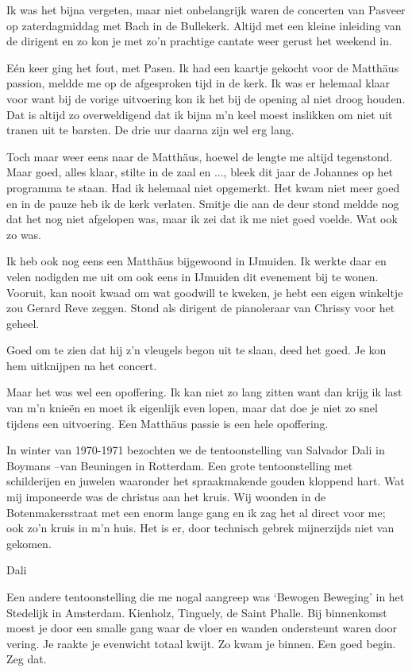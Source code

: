 \documentclass[10pt,twoside,openright]{memoir}
\begin{document}
Ik was het bijna vergeten, maar niet onbelangrijk waren de concerten van Pasveer op zaterdagmiddag met Bach in de Bullekerk. Altijd met een kleine inleiding van de dirigent en zo kon je met zo’n prachtige cantate weer gerust het weekend in.

Eén keer ging het fout, met Pasen. Ik had een kaartje gekocht voor de Matthäus passion, meldde me op de afgesproken tijd in de kerk. Ik was er helemaal klaar voor want bij de vorige uitvoering kon ik het bij de opening al niet droog houden. Dat is altijd zo overweldigend dat ik bijna m’n keel moest inslikken om niet uit tranen uit te barsten. De drie uur daarna zijn wel erg lang. 

Toch maar weer eens naar de Matthäus, hoewel de lengte me altijd tegenstond. Maar goed, alles klaar, stilte in de zaal en ..., bleek dit jaar de Johannes op het programma te staan. Had ik helemaal niet opgemerkt. Het kwam niet meer goed en in de pauze heb ik de kerk verlaten. Smitje die aan de deur stond meldde nog dat het nog niet afgelopen was, maar ik zei dat ik me niet goed voelde. Wat ook zo was.

Ik heb ook nog eens een Matthäus bijgewoond in IJmuiden. Ik werkte daar en velen nodigden me uit om ook eens in IJmuiden dit evenement bij te wonen. Vooruit, kan nooit kwaad om wat goodwill te kweken, je hebt een eigen winkeltje zou Gerard Reve zeggen. Stond als dirigent de pianoleraar van Chrissy voor het geheel. 

Goed om te zien dat hij z’n vleugels begon uit te slaan, deed het goed. Je kon hem uitknijpen na het concert.  

Maar het was wel een opoffering. Ik kan niet zo lang zitten want dan krijg ik last van m’n knieën en moet ik eigenlijk even lopen, maar dat doe je niet zo snel tijdens een uitvoering. Een Matthäus passie is een hele opoffering.

In winter van 1970-1971 bezochten we de tentoonstelling van Salvador Dali in Boymans –van Beuningen in Rotterdam. Een grote tentoonstelling met schilderijen en juwelen waaronder het spraakmakende gouden kloppend hart. Wat mij imponeerde was de christus aan het kruis. Wij woonden in de Botenmakersstraat met een enorm lange gang en ik zag het al direct voor me; ook zo’n kruis in m’n huis. Het is er, door technisch gebrek mijnerzijds niet van gekomen.

Dali

Een andere tentoonstelling die me nogal aangreep was ‘Bewogen Beweging’ in het Stedelijk in Amsterdam. Kienholz, Tinguely, de Saint Phalle. Bij binnenkomst moest je door een smalle gang waar de vloer en wanden ondersteunt waren door vering. Je raakte je evenwicht totaal kwijt. Zo kwam je binnen. Een goed begin. Zeg dat.
\end{document}
